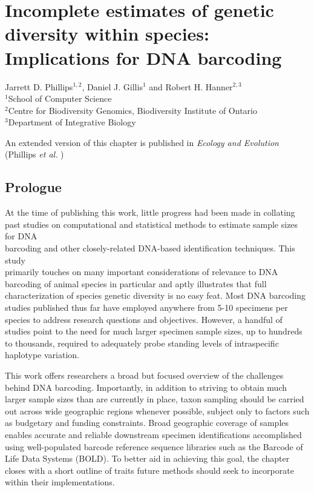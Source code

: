 \chapter{Incomplete estimates of genetic diversity within species: Implications for DNA barcoding}
\linespread{1.0}

\noindent Jarrett D. Phillips$^{1, 2}$, Daniel J. Gillis$^1$ and Robert H. Hanner$^{2, 3}$ \\ $^1$School of Computer Science \\ $^2$Centre for Biodiversity Genomics, Biodiversity Institute of Ontario \\ $^3$Department of Integrative Biology

\vspace{\fill}

\noindent An extended version of this chapter is published in \textit{Ecology and Evolution} \\ (Phillips \textit{et al.} \cite{phillips2019incomplete})


\section{Prologue}

At the time of publishing this work, little progress had been made in collating past studies on computational and statistical methods to estimate sample sizes for DNA \\ barcoding and other closely-related DNA-based identification techniques. This study \\ primarily touches on many important considerations of relevance to DNA barcoding of animal species in particular and aptly illustrates that full characterization of species genetic diversity is no easy feat. Most DNA barcoding studies published thus far have employed anywhere from 5-10 specimens per species to address research questions and objectives. However, a handful of studies point to the need for much larger specimen sample sizes, up to hundreds to thousands, required to adequately probe standing levels of intraspecific haplotype variation.



This work offers researchers a broad but focused overview of the challenges behind DNA barcoding. Importantly, in addition to striving to obtain much larger sample sizes than are currently in place, taxon sampling should be carried out across wide geographic regions whenever possible, subject only to factors such as budgetary and funding constraints. Broad geographic coverage of samples enables accurate and reliable downstream specimen identifications accomplished using well-populated barcode reference sequence libraries such as the Barcode of Life Data Systems (BOLD). To better aid in achieving this goal, the chapter closes with a short outline of traits future methods should seek to incorporate within their implementations.

